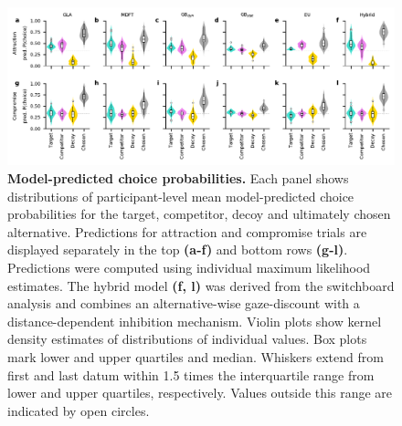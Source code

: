 \documentclass[11pt, a4paper]{article}
\begin{document}
\begin{refsection}
\begin{figure}[ht!]
\begin{centering}
\includegraphics[width=\textwidth]{../figures/S_model-predicted-choiceprobs.pdf}
\caption{\textbf{Model-predicted choice probabilities.} Each panel shows distributions of participant-level mean model-predicted choice probabilities for the target, competitor, decoy and ultimately chosen alternative. Predictions for attraction and compromise trials are displayed separately in the top \textbf{(a-f)} and bottom rows \textbf{(g-l)}. Predictions were computed using individual maximum likelihood estimates. The hybrid model \textbf{(f, l)} was derived from the switchboard analysis and combines an alternative-wise gaze-discount with a distance-dependent inhibition mechanism. Violin plots show kernel density estimates of distributions of individual values. Box plots mark lower and upper quartiles and median. Whiskers extend from first and last datum within 1.5 times the interquartile range from lower and upper quartiles, respectively. Values outside this range are indicated by open circles.}
\label{fig:model-pred-probs}
\end{centering}
\end{figure}
\clearpage


\end{refsection}
\end{document}
